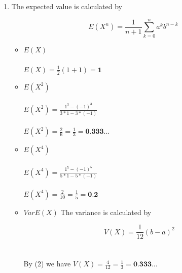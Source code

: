 \documentclass[11pt,a4paper]{article}
\begin{document}
\begin{enumerate}[label=(\alph*)]
\item The expected value is calculated by

\begin{equation}
E(X^{n}) = \frac{1}{n+1} \sum_{k=0}^{n} a^{k}b^{n-k}
\end{equation}

\begin{itemize}
    \item\textbf{$E(X)$}
    \\
    \\
    $E(X) = \frac{1}{2} (1+1) = \textbf{1}$
    \\
    
    \item\textbf{$E(X^{2})$} 
    \\
    \\
    $E(X^{2}) = \frac{1^{3} - (-1)^{3}}{3*1-3*(-1)}$
    \\
    \\
    $E(X^{2}) = \frac{2}{6} = \frac{1}{3} = \textbf{0.333...}$
    \\
    
    \item\textbf{$E(X^{4})$}
    \\
    \\
    $E(X^{4}) = \frac{1^{5} - (-1)^{5}}{5*1-5*(-1)}$
    \\
    \\
    $E(X^{4}) = \frac{2}{10} = \frac{1}{5} = \textbf{0.2}$
    \\
    
    \item\textbf{$VarE(X)$}
    The variance is calculated by

    \begin{equation}
       V(X) = \frac{1}{12} (b-a)^{2}
    \end{equation}
    \\
    \\
   By (2) we have $V(X) = \frac{4}{12} = \frac{1}{3} = \textbf{0.333...}$
    
\end{itemize}






\end{enumerate}



\section{}


\section{}




%
%
\end{document}
